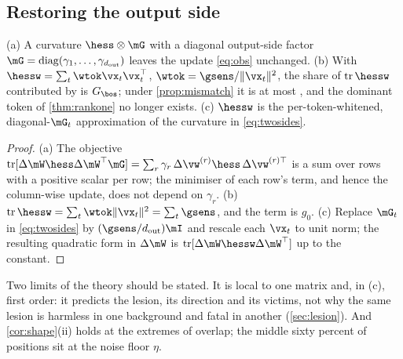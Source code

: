 \subsection{Restoring the output side}
\label{sec:mechanism:restore}
\begin{proposition}
\label{prop:tokenlevel}
(a) A curvature $\hess\otimes\mG$ with a diagonal output-side factor $\mG=\operatorname{diag}(\gamma_1,\dots,\gamma_{d_{\mathrm{out}}})$ leaves the update \cref{eq:obs} unchanged.
(b) With $\hessw=\sum_t\wtok\vx_t\vx_t^\top$, $\wtok=\gsens/\|\vx_t\|^2$, the share of $\operatorname{tr}\hessw$ contributed by \bos{} is $G_{\bos}$; under \cref{prop:mismatch} it is at most \GbosMax{}, and the dominant token of \cref{thm:rankone} no longer exists.
(c) $\hessw$ is the per-token-whitened, diagonal-$\mG_t$ approximation of the curvature in \cref{eq:twosides}.
\end{proposition}
\begin{proof}
(a) The objective $\operatorname{tr}[\Delta\mW\hess\Delta\mW^\top\mG]=\sum_r\gamma_r\,\Delta\vw^{(r)}\hess\,\Delta\vw^{(r)\top}$ is a sum over rows with a positive scalar per row; the minimiser of each row's term, and hence the column-wise update, does not depend on $\gamma_r$.
(b) $\operatorname{tr}\hessw=\sum_t\wtok\|\vx_t\|^2=\sum_t\gsens$, and the \bos{} term is $g_0$.
(c) Replace $\mG_t$ in \cref{eq:twosides} by $(\gsens/d_{\mathrm{out}})\mI$ and rescale each $\vx_t$ to unit norm; the resulting quadratic form in $\Delta\mW$ is $\operatorname{tr}[\Delta\mW\hessw\Delta\mW^\top]$ up to the constant.
\end{proof}
Two limits of the theory should be stated.
It is local to one matrix and, in (c), first order: it predicts the lesion, its direction and its victims, not why the same lesion is harmless in one background and fatal in another (\cref{sec:lesion}).
And \cref{cor:shape}(ii) holds at the extremes of overlap; the middle sixty percent of positions sit at the noise floor $\eta$.
